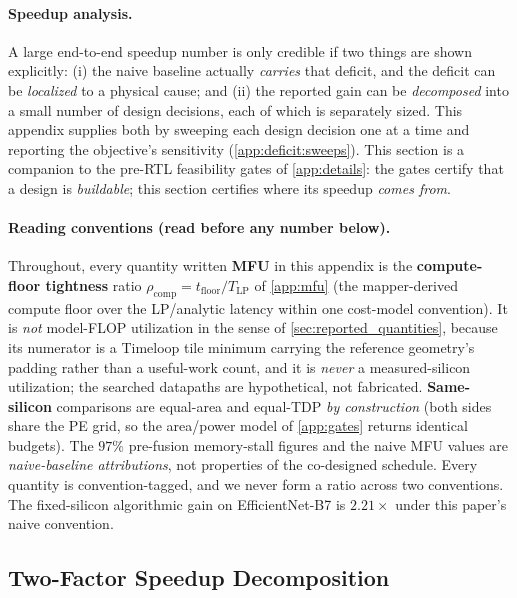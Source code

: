 \paragraph{Speedup analysis.}
A large end-to-end speedup number is only credible if two things are shown explicitly: (i) the naive baseline actually \emph{carries} that deficit, and the deficit can be \emph{localized} to a physical cause; and (ii) the reported gain can be \emph{decomposed} into a small number of design decisions, each of which is separately sized.
This appendix supplies both by sweeping each design decision one at a time and reporting the objective's sensitivity (\cref{app:deficit:sweeps}).
This section is a companion to the pre-RTL feasibility gates of \cref{app:details}: the gates certify that a design is \emph{buildable}; this section certifies where its speedup \emph{comes from}.

\paragraph{Reading conventions (read before any number below).}
Throughout, every quantity written \textbf{MFU} in this appendix is the \textbf{compute-floor tightness} ratio $\rho_{\mathrm{comp}}=t_{\mathrm{floor}}/T_{\mathrm{LP}}$ of \cref{app:mfu} (the mapper-derived compute floor over the LP/analytic latency within one cost-model convention).
It is \emph{not} model-FLOP utilization in the sense of \cref{sec:reported_quantities}, because its numerator is a Timeloop tile minimum carrying the reference geometry's padding rather than a useful-work count, and it is \emph{never} a measured-silicon utilization; the searched datapaths are hypothetical, not fabricated.
\textbf{Same-silicon} comparisons are equal-area and equal-TDP \emph{by construction} (both sides share the PE grid, so the area/power model of \cref{app:gates} returns identical budgets).
The $97\%$ pre-fusion memory-stall figures and the naive MFU values are \emph{naive-baseline attributions}, not properties of the co-designed schedule.
Every quantity is convention-tagged, and we never form a ratio across two conventions.
The fixed-silicon algorithmic gain on EfficientNet-B7 is $2.21\times$ under this paper's naive convention.

\iffalse %
\subsection{Two-Factor Speedup Decomposition}
\label{app:deficit:twofactor}

